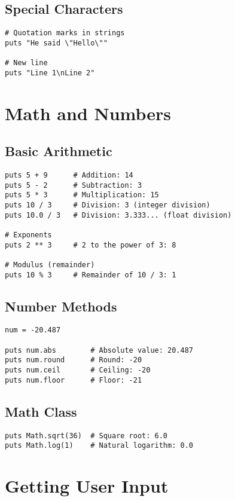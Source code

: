 \documentclass[12pt,a4paper]{article}
\begin{document}
\subsection{Special Characters}

\begin{lstlisting}
# Quotation marks in strings
puts "He said \"Hello\""

# New line
puts "Line 1\nLine 2"
\end{lstlisting}

\section{Math and Numbers}

\subsection{Basic Arithmetic}

\begin{lstlisting}
puts 5 + 9      # Addition: 14
puts 5 - 2      # Subtraction: 3
puts 5 * 3      # Multiplication: 15
puts 10 / 3     # Division: 3 (integer division)
puts 10.0 / 3   # Division: 3.333... (float division)

# Exponents
puts 2 ** 3     # 2 to the power of 3: 8

# Modulus (remainder)
puts 10 % 3     # Remainder of 10 / 3: 1
\end{lstlisting}

\subsection{Number Methods}

\begin{lstlisting}
num = -20.487

puts num.abs        # Absolute value: 20.487
puts num.round      # Round: -20
puts num.ceil       # Ceiling: -20
puts num.floor      # Floor: -21
\end{lstlisting}

\subsection{Math Class}

\begin{lstlisting}
puts Math.sqrt(36)  # Square root: 6.0
puts Math.log(1)    # Natural logarithm: 0.0
\end{lstlisting}

\section{Getting User Input}
\end{document}

